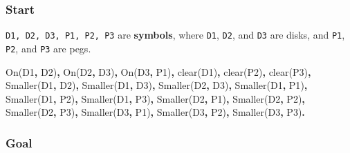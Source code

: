 \documentclass[
  letterpaper,
  DIV=11,
  numbers=noendperiod]{scrartcl}
\newenvironment{Shaded}{\begin{snugshade}}{\end{snugshade}}
\newcommand{\DataTypeTok}[1]{\textcolor[rgb]{0.68,0.00,0.00}{#1}}
\newcommand{\KeywordTok}[1]{\textcolor[rgb]{0.00,0.23,0.31}{\textbf{#1}}}
\newcommand{\NormalTok}[1]{\textcolor[rgb]{0.00,0.23,0.31}{#1}}
\begin{document}
\subsubsection{Start}\label{start}

\texttt{D1,\ D2,\ D3,\ P1,\ P2,\ P3} are \textbf{symbols}, where
\texttt{D1}, \texttt{D2}, and \texttt{D3} are disks, and \texttt{P1},
\texttt{P2}, and \texttt{P3} are pegs.

\begin{Shaded}
\begin{Highlighting}[]
\DataTypeTok{On}\NormalTok{(}\DataTypeTok{D1}\KeywordTok{,} \DataTypeTok{D2}\NormalTok{)}\KeywordTok{,} \DataTypeTok{On}\NormalTok{(}\DataTypeTok{D2}\KeywordTok{,} \DataTypeTok{D3}\NormalTok{)}\KeywordTok{,} \DataTypeTok{On}\NormalTok{(}\DataTypeTok{D3}\KeywordTok{,} \DataTypeTok{P1}\NormalTok{)}\KeywordTok{,}
\NormalTok{clear(}\DataTypeTok{D1}\NormalTok{)}\KeywordTok{,}\NormalTok{ clear(}\DataTypeTok{P2}\NormalTok{)}\KeywordTok{,}\NormalTok{ clear(}\DataTypeTok{P3}\NormalTok{)}\KeywordTok{,}
\DataTypeTok{Smaller}\NormalTok{(}\DataTypeTok{D1}\KeywordTok{,} \DataTypeTok{D2}\NormalTok{)}\KeywordTok{,} \DataTypeTok{Smaller}\NormalTok{(}\DataTypeTok{D1}\KeywordTok{,} \DataTypeTok{D3}\NormalTok{)}\KeywordTok{,} \DataTypeTok{Smaller}\NormalTok{(}\DataTypeTok{D2}\KeywordTok{,} \DataTypeTok{D3}\NormalTok{)}\KeywordTok{,}
\DataTypeTok{Smaller}\NormalTok{(}\DataTypeTok{D1}\KeywordTok{,} \DataTypeTok{P1}\NormalTok{)}\KeywordTok{,} \DataTypeTok{Smaller}\NormalTok{(}\DataTypeTok{D1}\KeywordTok{,} \DataTypeTok{P2}\NormalTok{)}\KeywordTok{,} \DataTypeTok{Smaller}\NormalTok{(}\DataTypeTok{D1}\KeywordTok{,} \DataTypeTok{P3}\NormalTok{)}\KeywordTok{,}
\DataTypeTok{Smaller}\NormalTok{(}\DataTypeTok{D2}\KeywordTok{,} \DataTypeTok{P1}\NormalTok{)}\KeywordTok{,} \DataTypeTok{Smaller}\NormalTok{(}\DataTypeTok{D2}\KeywordTok{,} \DataTypeTok{P2}\NormalTok{)}\KeywordTok{,} \DataTypeTok{Smaller}\NormalTok{(}\DataTypeTok{D2}\KeywordTok{,} \DataTypeTok{P3}\NormalTok{)}\KeywordTok{,}
\DataTypeTok{Smaller}\NormalTok{(}\DataTypeTok{D3}\KeywordTok{,} \DataTypeTok{P1}\NormalTok{)}\KeywordTok{,} \DataTypeTok{Smaller}\NormalTok{(}\DataTypeTok{D3}\KeywordTok{,} \DataTypeTok{P2}\NormalTok{)}\KeywordTok{,} \DataTypeTok{Smaller}\NormalTok{(}\DataTypeTok{D3}\KeywordTok{,} \DataTypeTok{P3}\NormalTok{)}\KeywordTok{.}
\end{Highlighting}
\end{Shaded}

\subsubsection{Goal}\label{goal}
\end{document}
